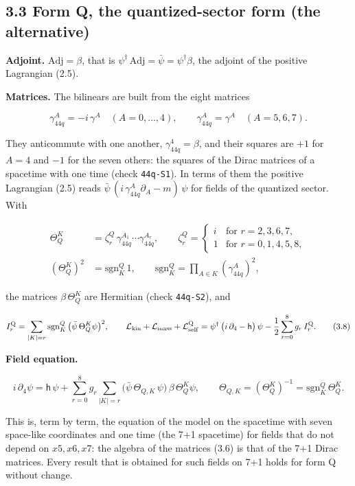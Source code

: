 \documentclass[
  10pt,
]{article}
\begin{document}
\hypertarget{form-q-the-quantized-sector-form-the-alternative}{%
\subsection{3.3 Form Q, the quantized-sector form (the
alternative)}\label{form-q-the-quantized-sector-form-the-alternative}}

\textbf{Adjoint.} \(\mathrm{Adj}=\beta\), that is
\(\psi^\dagger\,\mathrm{Adj}=\bar\psi=\psi^\dagger\beta\), the adjoint
of the positive Lagrangian (2.5).

\textbf{Matrices.} The bilinears are built from the eight matrices

\[\gamma_{44q}^A=-i\,\gamma^A\quad(A=0,\dots,4),\qquad\gamma_{44q}^A=\gamma^A\quad(A=5,6,7).\tag{3.6}\]

They anticommute with one another, \(\gamma_{44q}^4=\beta\), and their
squares are \(+1\) for \(A=4\) and \(-1\) for the seven others: the
squares of the Dirac matrices of a spacetime with one time (check
\texttt{44q-S1}). In terms of them the positive Lagrangian (2.5) reads
\(\bar\psi\,(i\,\gamma_{44q}^A\partial_A-m)\,\psi\) for fields of the
quantized sector. With

\[\begin{aligned}
\Theta_Q^K&=\zeta^Q_r\,\gamma_{44q}^{A_1}\cdots\gamma_{44q}^{A_r},\qquad
\zeta^Q_r=\begin{cases}i&\text{for }r=2,3,6,7,\\1&\text{for }r=0,1,4,5,8,\end{cases}\\
(\Theta_Q^K)^2&=\mathrm{sgn}^Q_K\,1,\qquad\mathrm{sgn}^Q_K=\prod_{A\in K}(\gamma_{44q}^A)^2,
\end{aligned}\tag{3.7}\]

the matrices \(\beta\,\Theta_Q^K\) are Hermitian (check
\texttt{44q-S2}), and

\[I_r^{\rm Q}=\sum_{|K|=r}\mathrm{sgn}^Q_K\,\big(\bar\psi\,\Theta_Q^K\psi\big)^2,\qquad
\mathcal L_{\rm kin}+\mathcal L_{\rm mass}+\mathcal L_{\rm self}^{\rm Q}=\psi^\dagger\,\big(i\,\partial_4-\mathsf h\big)\,\psi-\frac12\sum_{r=0}^{8}g_r\,I_r^{\rm Q}.\tag{3.8}\]

\textbf{Field equation.}

\[i\,\partial_4\psi=\mathsf h\,\psi+\sum_{r=0}^{8}g_r\sum_{|K|=r}\big(\bar\psi\,\Theta_{Q,K}\,\psi\big)\,\beta\,\Theta_Q^K\psi,\qquad\Theta_{Q,K}=(\Theta_Q^K)^{-1}=\mathrm{sgn}^Q_K\,\Theta_Q^K.\tag{3.9}\]

This is, term by term, the equation of the model on the spacetime with
seven space-like coordinates and one time (the 7+1 spacetime) for fields
that do not depend on \(x5,x6,x7\): the algebra of the matrices (3.6) is
that of the 7+1 Dirac matrices. Every result that is obtained for such
fields on 7+1 holds for form Q without change.
\end{document}
